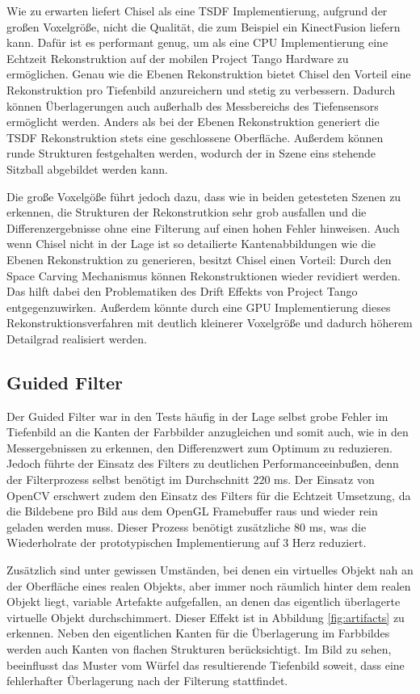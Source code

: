 Wie zu erwarten liefert Chisel als eine TSDF Implementierung, aufgrund der großen Voxelgröße, nicht die Qualität, die zum Beispiel ein KinectFusion liefern kann. Dafür ist es performant genug, um als eine CPU Implementierung eine Echtzeit Rekonstruktion auf der mobilen Project Tango Hardware zu ermöglichen. Genau wie die Ebenen Rekonstruktion bietet Chisel den Vorteil eine Rekonstruktion pro Tiefenbild anzureichern und stetig zu verbessern. Dadurch können Überlagerungen auch außerhalb des Messbereichs des Tiefensensors ermöglicht werden. Anders als bei der Ebenen Rekonstruktion generiert die TSDF Rekonstruktion stets eine geschlossene Oberfläche. Außerdem können runde Strukturen festgehalten werden, wodurch der in Szene eins stehende Sitzball abgebildet werden kann.

Die große Voxelgöße führt jedoch dazu, dass wie in beiden getesteten Szenen zu erkennen, die Strukturen der Rekonstrutkion sehr grob ausfallen und die Differenzergebnisse ohne eine Filterung auf einen hohen Fehler hinweisen. Auch wenn Chisel nicht in der Lage ist so detailierte Kantenabbildungen wie die Ebenen Rekonstruktion zu generieren, besitzt Chisel einen Vorteil: Durch den Space Carving Mechanismus können Rekonstruktionen wieder revidiert werden. Das hilft dabei den Problematiken des Drift Effekts von Project Tango entgegenzuwirken. Außerdem könnte durch eine GPU Implementierung dieses Rekonstruktionsverfahren mit deutlich kleinerer Voxelgröße und dadurch höherem Detailgrad realisiert werden.


\subsection*{Guided Filter}

Der Guided Filter war in den Tests häufig in der Lage selbst grobe Fehler im Tiefenbild an die Kanten der Farbbilder anzugleichen und somit auch, wie in den Messergebnissen zu erkennen, den Differenzwert zum Optimum zu reduzieren. Jedoch führte der Einsatz des Filters zu deutlichen Performanceeinbußen, denn der Filterprozess selbst benötigt im Durchschnitt \(220\) ms. Der Einsatz von OpenCV erschwert zudem den Einsatz des Filters für die Echtzeit Umsetzung, da die Bildebene pro Bild aus dem OpenGL Framebuffer raus und wieder rein geladen werden muss. Dieser Prozess benötigt zusätzliche \(80\) ms, was die Wiederholrate der prototypischen Implementierung auf 3 Herz reduziert. 

Zusätzlich sind unter gewissen Umständen, bei denen ein virtuelles Objekt nah an der Oberfläche eines realen Objekts, aber immer noch räumlich hinter dem realen Objekt liegt, variable Artefakte aufgefallen, an denen das eigentlich überlagerte virtuelle Objekt durchschimmert. Dieser Effekt ist in Abbildung \ref{fig:artifacts} zu erkennen. Neben den eigentlichen Kanten für die Überlagerung im Farbbildes werden auch Kanten von flachen Strukturen berücksichtigt. Im Bild zu sehen, beeinflusst das Muster vom Würfel das resultierende Tiefenbild soweit, dass eine fehlerhafter Überlagerung nach der Filterung stattfindet. \\
 
